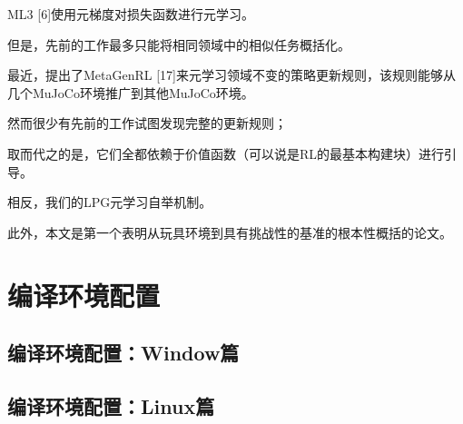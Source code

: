 ML3 [6]使用元梯度对损失函数进行元学习。

但是，先前的工作最多只能将相同领域中的相似任务概括化。

最近，提出了MetaGenRL [17]来元学习领域不变的策略更新规则，该规则能够从几个MuJoCo环境推广到其他MuJoCo环境。

然而很少有先前的工作试图发现完整的更新规则；

取而代之的是，它们全都依赖于价值函数（可以说是RL的最基本构建块）进行引导。

相反，我们的LPG元学习自举机制。

此外，本文是第一个表明从玩具环境到具有挑战性的基准的根本性概括的论文。

\section{编译环境配置}


\subsection{编译环境配置：Window篇}


\subsection{编译环境配置：Linux篇}




